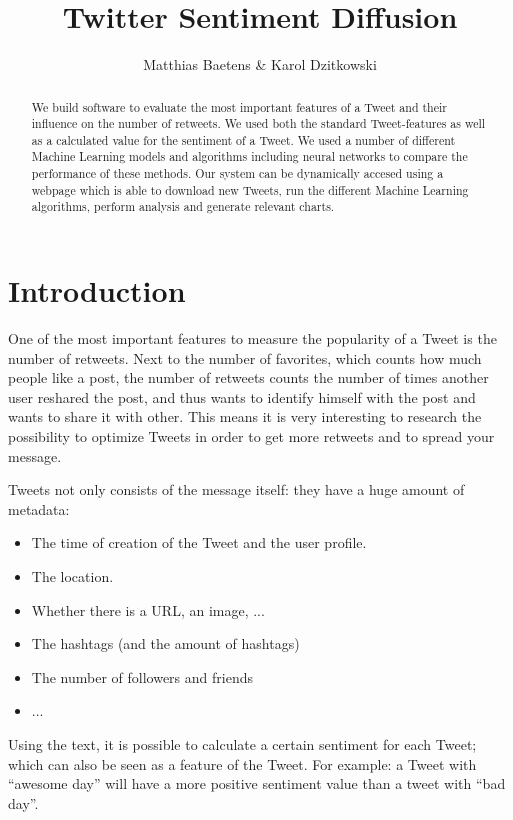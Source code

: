 \documentclass[10pt]{IEEEtran}
\title{Twitter Sentiment Diffusion}
\author{Matthias Baetens \& Karol Dzitkowski}
\begin{document}
\maketitle

\begin{abstract}
We build software to evaluate the most important features of a Tweet and their influence on the number of retweets. We used both the standard Tweet-features as well as a calculated value for the sentiment of a Tweet. We used a number of different Machine Learning models and algorithms including neural networks to compare the performance of these methods. Our system can be dynamically accesed using a webpage which is able to download new Tweets, run the different Machine Learning algorithms, perform analysis and generate relevant charts. 
\end{abstract}

\section{Introduction}
One of the most important features to measure the popularity of a Tweet is the number of retweets. Next to the number of favorites, which counts how much people like a post, the number of retweets counts the number of times another user reshared the post, and thus wants to identify himself with the post and wants to share it with other. This means it is very interesting to research the possibility to optimize Tweets in order to get more retweets and to spread your message. 

Tweets not only consists of the message itself: they have a huge amount of metadata: 
\begin{itemize}
	\item The time of creation of the Tweet and the user profile.
	\item The location. 
	\item Whether there is a URL, an image, ...
	\item The hashtags (and the amount of hashtags)
	\item The number of followers and friends
	\item ...
\end{itemize}

Using the text, it is possible to calculate a certain sentiment for each Tweet; which can also be seen as a feature of the Tweet. For example: a Tweet with ``awesome day'' will have a more positive sentiment value than a tweet with ``bad day''.
\end{document}
